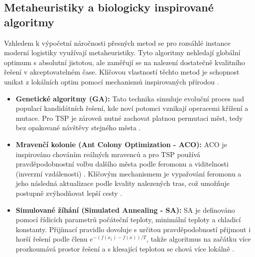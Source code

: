 \subsection{Metaheuristiky a biologicky inspirované algoritmy}
\label{subsection:BIA}
Vzhledem k výpočetní náročnosti přesných metod se pro rozsáhlé instance moderní logistiky využívají metaheuristiky. Tyto algoritmy nehledají globální optimum s absolutní jistotou, ale zaměřují se na nalezení dostatečně kvalitního řešení v akceptovatelném čase. Klíčovou vlastností těchto metod je schopnost unikat z lokálních optim pomocí mechanismů inspirovaných přírodou \cite{engelbrecht2002ci}.

\begin{itemize}
    \item \textbf{Genetické algoritmy (GA):} Tato technika simuluje evoluční proces nad populací kandidátních řešení, kde noví potomci vznikají operacemi křížení a mutace. Pro TSP je zároveň nutné zachovat platnou permutaci měst, tedy bez opakované návštěvy stejného města \cite{johnson1997tsp_local_search}.
    
    \item \textbf{Mravenčí kolonie (Ant Colony Optimization - ACO):} ACO je inspirováno chováním reálných mravenců a pro TSP používá pravděpodobnostní volbu dalšího města podle feromonu a viditelnosti (inverzní vzdálenosti) \cite{dorigo1997acs}. Klíčovým mechanismem je vypařování feromonu a jeho následná aktualizace podle kvality nalezených tras, což umožňuje postupně zvýhodňovat lepší cesty \cite{dorigo1997acs}.
    
    \item \textbf{Simulované žíhání (Simulated Annealing - SA):} SA je definováno pomocí řídicích parametrů počáteční teploty, minimální teploty a chladicí konstanty. Přijímací pravidlo dovoluje s určitou pravděpodobností přijmout i horší řešení podle členu $e^{-(f(x_1)-f(x))/T}$, takže algoritmus na začátku více prozkoumává prostor řešení a s klesající teplotou se chová více lokálně \cite{kirkpatrick1983optimization}.


\end{itemize}
